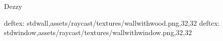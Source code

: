 Dezzy

deftex: stdwall,assets/raycast/textures/wallwithwood.png,32,32
deftex: stdwindow,assets/raycast/textures/wallwithwindow.png,32,32
